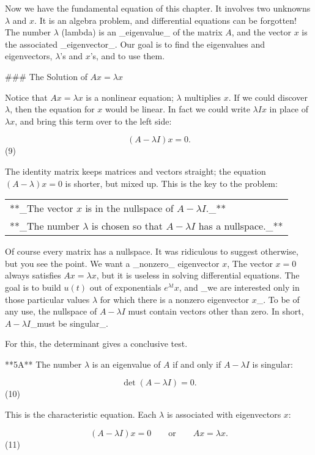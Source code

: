 Now we have the fundamental equation of this chapter. It involves two unknowns \(\lambda\) and \(x\). It is an algebra problem, and differential equations can be forgotten! The number \(\lambda\) (lambda) is an _eigenvalue_ of the matrix \(A\), and the vector \(x\) is the associated _eigenvector_. Our goal is to find the eigenvalues and eigenvectors, \(\lambda\)'s and \(x\)'s, and to use them.

### The Solution of \(Ax=\lambda x\)

Notice that \(Ax=\lambda x\) is a nonlinear equation; \(\lambda\) multiplies \(x\). If we could discover \(\lambda\), then the equation for \(x\) would be linear. In fact we could write \(\lambda Ix\) in place of \(\lambda x\), and bring this term over to the left side:

\[(A-\lambda I)x=0.\] (9)

The identity matrix keeps matrices and vectors straight; the equation \((A-\lambda)x=0\) is shorter, but mixed up. This is the key to the problem:

\begin{tabular}{|l|} \hline
**_The vector \(x\) is in the nullspace of \(A-\lambda I\)._** \\
**_The number \(\lambda\) is chosen so that \(A-\lambda I\) has a nullspace._** \\ \hline \end{tabular}

Of course every matrix has a nullspace. It was ridiculous to suggest otherwise, but you see the point. We want a _nonzero_ eigenvector \(x\), The vector \(x=0\) always satisfies \(Ax=\lambda x\), but it is useless in solving differential equations. The goal is to build \(u(t)\) out of exponentials \(e^{\lambda t}x\), and _we are interested only in those particular values \(\lambda\) for which there is a nonzero eigenvector \(x\)_. To be of any use, the nullspace of \(A-\lambda I\) must contain vectors other than zero. In short, \(A-\lambda I\)_must be singular_.

For this, the determinant gives a conclusive test.

**5A** The number \(\lambda\) is an eigenvalue of \(A\) if and only if \(A-\lambda I\) is singular:

\[\det(A-\lambda I)=0.\] (10)

This is the characteristic equation. Each \(\lambda\) is associated with eigenvectors \(x\):

\[(A-\lambda I)x=0\qquad\text{or}\qquad Ax=\lambda x.\] (11)

